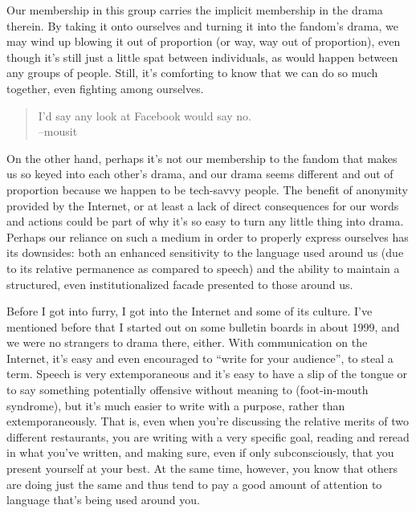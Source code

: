 Our membership in this group carries the implicit membership in the drama therein. By taking it onto ourselves and turning it into the fandom's drama, we may wind up blowing it out of proportion (or way, way out of proportion), even though it's still just a little spat between individuals, as would happen between any groups of people. Still, it's comforting to know that we can do so much together, even fighting among ourselves.

\begin{quote}
  I'd say any look at Facebook would say no.\\
  --mousit
\end{quote}

On the other hand, perhaps it's not our membership to the fandom that makes us so keyed into each other's drama, and our drama seems different and out of proportion because we happen to be tech-savvy people.  The benefit of anonymity provided by the Internet, or at least a lack of direct consequences for our words and actions could be part of why it's so easy to turn any little thing into drama.  Perhaps our reliance on such a medium in order to properly express ourselves has its downsides: both an enhanced sensitivity to the language used around us (due to its relative permanence as compared to speech) and the ability to maintain a structured, even institutionalized facade presented to those around us.

Before I got into furry, I got into the Internet and some of its culture.  I've mentioned before that I started out on some bulletin boards in about 1999, and we were no strangers to drama there, either.  With communication on the Internet, it's easy and even encouraged to ``write for your audience'', to steal a term. Speech is very extemporaneous and it's easy to have a slip of the tongue or to say something potentially offensive without meaning to (foot-in-mouth syndrome), but it's much easier to write with a purpose, rather than extemporaneously. That is, even when you're discussing the relative merits of two different restaurants, you are writing with a very specific goal, reading and reread in what you've written, and making sure, even if only subconsciously, that you present yourself at your best. At the same time, however, you know that others are doing just the same and thus tend to pay a good amount of attention to language that's being used around you.

